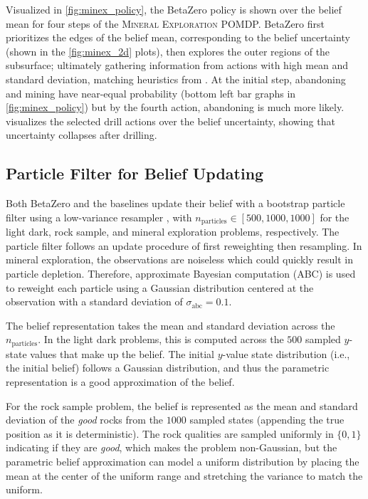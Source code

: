 Visualized in \cref{fig:minex_policy}, the BetaZero policy is shown over the belief mean for four steps of the \textsc{Mineral Exploration} POMDP.
BetaZero first prioritizes the edges of the belief mean, corresponding to the belief uncertainty (shown in the \cref{fig:minex_2d} plots), then explores the outer regions of the subsurface; ultimately gathering information from actions with high mean and standard deviation, matching heuristics from \textcite{mern2023intelligent}.
At the initial step, abandoning and mining have near-equal probability (bottom left bar graphs in \cref{fig:minex_policy}) but by the fourth action, abandoning is much more likely.
 visualizes the selected drill actions over the belief uncertainty, showing that uncertainty collapses after drilling.


\subsection{Particle Filter for Belief Updating}
Both BetaZero and the baselines update their belief with a bootstrap particle filter using a low-variance resampler \cite{gordon1993novel}, with $n_\text{particles} \in [500,1000,1000]$ for the light dark, rock sample, and mineral exploration problems, respectively.
The particle filter follows an update procedure of first reweighting then resampling.
In mineral exploration, the observations are noiseless which could quickly result in particle depletion.
Therefore, approximate Bayesian computation (ABC) \cite{csillery2010approximate} is used to reweight each particle using a Gaussian distribution centered at the observation with a standard deviation of $\sigma_\text{abc} = 0.1$.

The belief representation takes the mean and standard deviation across the $n_\text{particles}$.
In the light dark problems, this is computed across the $500$ sampled $y$-state values that make up the belief.
The initial $y$-value state distribution (i.e., the initial belief) follows a Gaussian distribution, and thus the parametric representation is a good approximation of the belief.

For the rock sample problem, the belief is represented as the mean and standard deviation of the \textit{good} rocks from the $1000$ sampled states (appending the true position as it is deterministic).
The rock qualities are sampled uniformly in $\{0,1\}$ indicating if they are \textit{good}, which makes the problem non-Gaussian, but the parametric belief approximation can model a uniform distribution by placing the mean at the center of the uniform range and stretching the variance to match the uniform.

